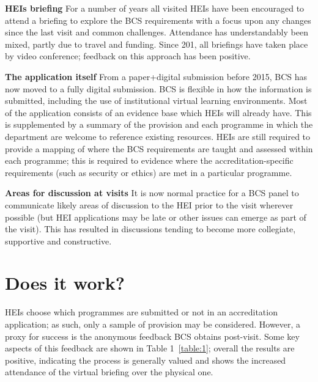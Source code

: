 \documentclass[sigconf]{acmart}
\begin{document}
{\textbf{HEIs briefing}} For a number of years all visited HEIs have
been encouraged to attend a briefing to explore the BCS requirements
with a focus upon any changes since the last visit and common
challenges. Attendance has understandably been mixed, partly due to
travel and funding. Since 201, all briefings have taken place by video
conference; feedback on this approach has been positive.

{\textbf{The application itself}} From a paper+digital submission
before 2015, BCS has now moved to a fully digital submission. BCS is
flexible in how the information is submitted, including the use of
institutional virtual learning environments. Most of the application
consists of an evidence base which HEIs will already have. This is
supplemented by a summary of the provision and each programme in which
the department are welcome to reference existing resources. HEIs are
still required to provide a mapping of where the BCS requirements are
taught and assessed within each programme; this is required to
evidence where the accreditation-specific requirements (such as
security or ethics) are met in a particular programme.

{\textbf{Areas for discussion at visits}} It is now normal practice
for a BCS panel to communicate likely areas of discussion to the HEI
prior to the visit wherever possible (but HEI applications may be late
or other issues can emerge as part of the visit).  This has resulted
in discussions tending to become more collegiate, supportive and
constructive.


\section {Does it work?}

HEIs choose which programmes are submitted or not in an accreditation
application; as such, only a sample of provision may be
considered. However, a proxy for success is the anonymous feedback BCS
obtains post-visit. Some key aspects of this feedback are shown in
Table 1~\ref{table:1}; overall the results are positive, indicating
the process is generally valued and shows the increased attendance of
the virtual briefing over the physical one.
\end{document}
